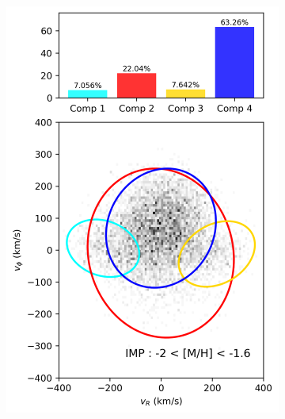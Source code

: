 \documentclass[a4paper,12pt]{article}
\begin{document}
\begin{figure}[h]
\begin{subfigure}[t]{0.24\textwidth}
    \end{subfigure}
    \hfill
    \begin{subfigure}[t]{0.24\textwidth}
        \centering
        \includegraphics[width=\linewidth]{../figures/gmm_IMP.png}
    \end{subfigure}
    \hfill
    \begin{subfigure}[t]{0.24\textwidth}
        \centering

\end{subfigure}
\end{figure}
\end{document}
